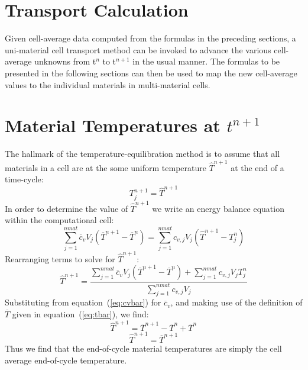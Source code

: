 \documentclass[12pt]{article}
\begin{document}
\section{Transport Calculation}

Given cell-average data computed from the formulas in the
preceding sections, a uni-material cell transport method can
be invoked to advance the various cell-average unknowns 
from t$^{n}$ to t$^{n+1}$
in the usual manner. The formulas to be presented in the following
sections can then be used to map the new cell-average values to
the individual materials in multi-material cells.

\section{Material Temperatures at $t^{n+1}$}

The hallmark of the temperature-equilibration method is to assume
that all materials in a cell are at the some uniform temperature 
$\widehat{T}^{n+1}$
at the end of a time-cycle:
\begin{equation}
T_{j}^{n+1} = \widehat{T}^{n+1}
\end{equation}
In order to determine the value of $\widehat{T}^{n+1}$ 
we write an energy balance equation within the computational cell:
\begin{equation}
 \sum_{j=1}^{nmat} \overline{c}_{v} V_{j} 
(\overline{T}^{n+1}-\overline{T}^{n}) = 
\sum_{j=1}^{nmat} c_{v,j} V_{j} (\widehat{T}^{n+1} - T_{j}^{n})
\end{equation}
Rearranging terms to solve for $\widehat{T}^{n+1}$:
\begin{equation}
\widehat{T}^{n+1} = \frac{ \sum_{j=1}^{nmat} \overline{c}_{v} V_{j}    
(\overline{T}^{n+1}-\overline{T}^{n}) +
\sum_{j=1}^{nmat} c_{v,j} V_{j} T_{j}^{n} }
{\sum_{j=1}^{nmat} c_{v,j}V_{j}}
\end{equation}
Substituting from equation~(\ref{eq:cvbar}) for $\overline{c}_{v}$, and
making use of the definition of $\overline{T}$ given in 
equation~(\ref{eq:tbar}), we find:
\begin{equation}
\widehat{T}^{n+1} = \overline{T}^{n+1} - \overline{T}^{n} + \overline{T}^{n}
\end{equation}
\begin{equation}
\widehat{T}^{n+1} = \overline{T}^{n+1}
\end{equation}
Thus we find that the end-of-cycle material temperatures are simply the cell
average end-of-cycle temperature.
\end{document}
